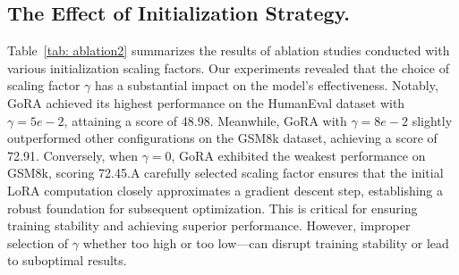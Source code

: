 \begin{table}[h!]
\centering
\small
\caption{Ablation studies on Rank Allocation strategy. The notation "GoRA(\(x\)-\(y\))" indicates the minimum and maximum rank allocation range, where \(x\) is the lower bound and \(y\) is the upper bound. We also report number of trainable parameters(\#Params) for model fine-tuned on MetaMathQA-100K using each setting.}
\label{tab: ablation1}
\end{table}


\subsection{The Effect of Initialization Strategy.}

Table~\ref{tab: ablation2} summarizes the results of ablation studies conducted with various initialization scaling factors. Our experiments revealed that the choice of scaling factor \(\gamma\) has a substantial impact on the model's effectiveness. Notably, GoRA achieved its highest performance on the HumanEval dataset with \(\gamma = 5e-2\), attaining a score of 48.98. Meanwhile, GoRA with 
\(\gamma = 8e-2\) slightly outperformed other configurations on the GSM8k dataset, achieving a score of 72.91. Conversely, when \(\gamma = 0\), GoRA exhibited the weakest performance on GSM8k, scoring 72.45.A carefully selected scaling factor ensures that the initial LoRA computation closely approximates a gradient descent step, establishing a robust foundation for subsequent optimization. This is critical for ensuring training stability and achieving superior performance. However, improper selection of \(\gamma\) whether too high or too low—can disrupt training stability or lead to suboptimal results.

